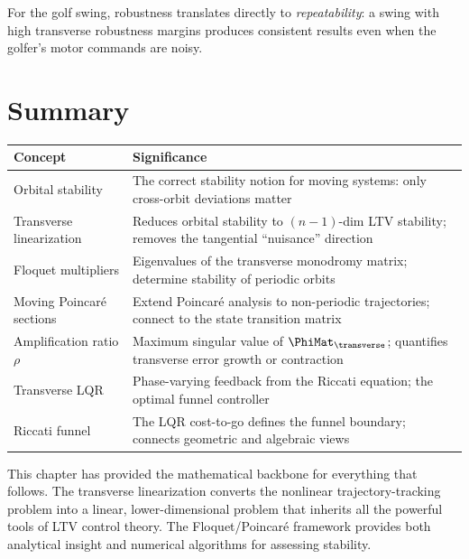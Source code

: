 \documentclass[12pt, openany]{book}
\theoremstyle{plain}
\begin{document}
For the golf swing, robustness translates directly to \emph{repeatability}:
a swing with high transverse robustness margins produces consistent results
even when the golfer's motor commands are noisy.

\section{Summary}

\begin{center}
\renewcommand{\arraystretch}{1.4}
\begin{tabular}{@{} l p{8.5cm} @{}}
  \toprule
  \textbf{Concept} & \textbf{Significance} \\
  \midrule
  Orbital stability & The correct stability notion for moving systems:
    only cross-orbit deviations matter \\
  Transverse linearization & Reduces orbital stability to $(n{-}1)$-dim
    LTV stability; removes the tangential ``nuisance'' direction \\
  Floquet multipliers & Eigenvalues of the transverse monodromy matrix;
    determine stability of periodic orbits \\
  Moving Poincar\'e sections & Extend Poincar\'e analysis to non-periodic
    trajectories; connect to the state transition matrix \\
  Amplification ratio $\rho$ & Maximum singular value of $\PhiMat_\transverse$;
    quantifies transverse error growth or contraction \\
  Transverse LQR & Phase-varying feedback from the Riccati equation; the
    optimal funnel controller \\
  Riccati funnel & The LQR cost-to-go defines the funnel boundary; connects
    geometric and algebraic views \\
  \bottomrule
\end{tabular}
\end{center}

\vspace{0.3cm}

This chapter has provided the mathematical backbone for everything that
follows. The transverse linearization converts the nonlinear trajectory-tracking
problem into a linear, lower-dimensional problem that inherits all the powerful
tools of LTV control theory. The Floquet/Poincar\'e framework provides both
analytical insight and numerical algorithms for assessing stability.
\end{document}
